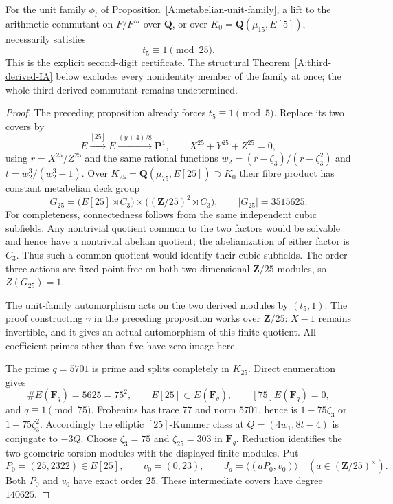 \begin{corollary}
\label{A:third-derived-second-digit}
For the unit family $\phi_t$ of
Proposition~\ref{A:metabelian-unit-family}, a lift to the
arithmetic commutant on $F/F'''$ over $\mathbf Q$, or over
$K_0=\mathbf Q(\mu_{15},E[5])$, necessarily satisfies
\[
                            t_5\equiv1\pmod{25}.
\]
This is the explicit second-digit certificate. The
structural Theorem~\ref{A:third-derived-IA} below
excludes every nonidentity member of the family at once;
the whole third-derived commutant remains undetermined.
\end{corollary}
\begin{proof}
The preceding proposition already forces
$t_5\equiv1\pmod5$. Replace its two covers by
\[
 E\xrightarrow{[25]}E\xrightarrow{(y+4)/8}\mathbf P^1,
 \qquad X^{25}+Y^{25}+Z^{25}=0,
\]
using $r=X^{25}/Z^{25}$ and the same rational functions
$w_2=(r-\zeta_3)/(r-\zeta_3^2)$ and $t=w_2^3/(w_2^3-1)$.
Over $K_{25}=\mathbf Q(\mu_{75},E[25])\supset K_0$ their fibre product
has constant metabelian deck group
\[
 G_{25}=
 \bigl(E[25]\rtimes C_3\bigr)
       \times\bigl((\mathbf Z/25)^2\rtimes C_3\bigr),
             \qquad |G_{25}|=3515625.
\]
For completeness, connectedness follows from the same
independent cubic subfields. Any nontrivial quotient
common to the two factors would be solvable and hence
have a nontrivial abelian quotient; the abelianization
of either factor is $C_3$. Thus such a common quotient
would identify their cubic subfields. The order-three
actions are fixed-point-free on both two-dimensional
$\mathbf Z/25$ modules, so $Z(G_{25})=1$.

The unit-family automorphism acts on the two derived
modules by $(t_5,1)$. The proof constructing $\gamma$
in the preceding proposition works over $\mathbf Z/25$:
$X-1$ remains invertible, and it gives an actual
automorphism of this finite quotient. All coefficient
primes other than five have zero image here.

The prime $q=5701$ is prime and splits completely in
$K_{25}$. Direct enumeration gives
\[
 \#E(\mathbf F_q)=5625=75^2,\qquad
 E[25]\subset E(\mathbf F_q),\qquad
 [75]E(\mathbf F_q)=0,
\]
and $q\equiv1\pmod{75}$. Frobenius has trace $77$ and
norm $5701$, hence is $1-75\zeta_3$ or
$1-75\zeta_3^2$. Accordingly the elliptic
$[25]$-Kummer class at $Q=(4w_1,8t-4)$ is conjugate
to $-3Q$. Choose $\zeta_3=75$ and $\zeta_{25}=303$
in $\mathbf F_q$. Reduction identifies the two
geometric torsion modules with the displayed finite
modules. Put
\[
 P_0=(25,2322)\in E[25],\qquad v_0=(0,23),\qquad
 J_a=\langle(aP_0,v_0)\rangle\quad(a\in(\mathbf Z/25)^\times).
\]
Both $P_0$ and $v_0$ have exact order $25$.
These intermediate covers have degree $140625$.


\end{proof}
